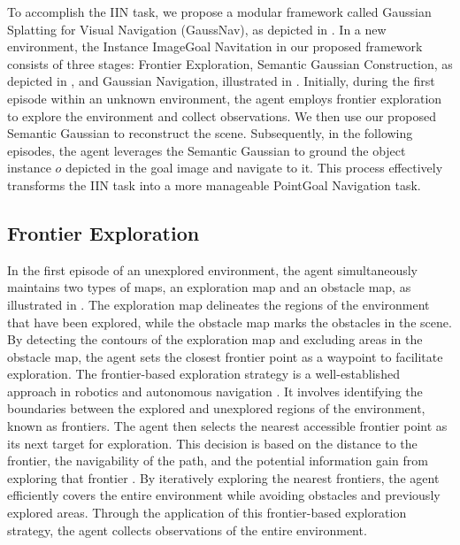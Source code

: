 To accomplish the IIN task, we propose a modular framework called Gaussian Splatting for Visual Navigation (GaussNav), as depicted in . In a new environment, the Instance ImageGoal Navitation in our proposed framework consists of three stages: Frontier Exploration, Semantic Gaussian Construction, as depicted in , and Gaussian Navigation, illustrated in . Initially, during the first episode within an unknown environment, the agent employs frontier exploration to explore the environment and collect observations. We then use our proposed Semantic Gaussian to reconstruct the scene. Subsequently, in the following episodes, the agent leverages the Semantic Gaussian to ground the object instance $o$ depicted in the goal image and navigate to it. This process effectively transforms the IIN task into a more manageable PointGoal Navigation task.

\subsection{Frontier Exploration}

In the first episode of an unexplored environment, the agent simultaneously maintains two types of maps, an exploration map and an obstacle map, as illustrated in . The exploration map delineates the regions of the environment that have been explored, while the obstacle map marks the obstacles in the scene. By detecting the contours of the exploration map and excluding areas in the obstacle map, the agent sets the closest frontier point as a waypoint to facilitate exploration. The frontier-based exploration strategy is a well-established approach in robotics and autonomous navigation \cite{yamauchi1997frontier, holz2010evaluating}. It involves identifying the boundaries between the explored and unexplored regions of the environment, known as frontiers. The agent then selects the nearest accessible frontier point as its next target for exploration. This decision is based on the distance to the frontier, the navigability of the path, and the potential information gain from exploring that frontier \cite{julia2012comparison}. By iteratively exploring the nearest frontiers, the agent efficiently covers the entire environment while avoiding obstacles and previously explored areas. Through the application of this frontier-based exploration strategy, the agent collects observations of the entire environment.



